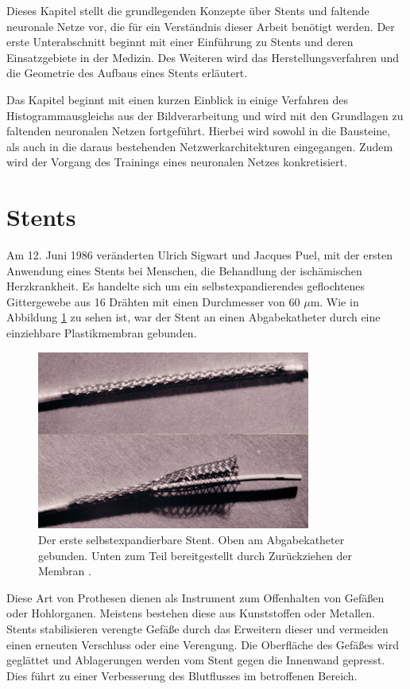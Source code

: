 Dieses Kapitel stellt die grundlegenden Konzepte über Stents und faltende neuronale Netze vor, die für ein Verständnis dieser Arbeit benötigt werden. Der erste Unterabschnitt beginnt mit einer Einführung zu Stents und deren Einsatzgebiete in der Medizin. Des Weiteren wird das Herstellungsverfahren und die Geometrie des Aufbaus eines Stents erläutert. 

\mypar Das Kapitel beginnt mit einen kurzen Einblick in einige Verfahren des Histogrammausgleichs aus der Bildverarbeitung und wird mit den Grundlagen zu faltenden neuronalen Netzen fortgeführt. Hierbei wird sowohl in die Bausteine, als auch in die daraus bestehenden Netzwerkarchitekturen eingegangen. Zudem wird der Vorgang des Trainings eines neuronalen Netzes konkretisiert. 


\section{Stents}\label{sec:?}
Am 12. Juni 1986 veränderten Ulrich Sigwart und Jacques Puel, mit der ersten Anwendung eines Stents bei Menschen, die Behandlung der ischämischen Herzkrankheit. Es handelte sich um ein selbstexpandierendes geflochtenes Gittergewebe aus 16 Drähten mit einen Durchmesser von 60 $\mu$m. Wie in Abbildung \ref{fig:stent_view} zu sehen ist, war der Stent an einen Abgabekatheter durch eine einziehbare Plastikmembran gebunden. \cite{sigwart}

\begin{figure}[h!]
\centering
\includegraphics[width=9cm]{98_images/first_stent.png}
\caption{Der erste selbstexpandierbare Stent. Oben am Abgabekatheter gebunden. Unten zum Teil bereitgestellt durch Zurückziehen der Membran \cite{sigwart}.}
\label{fig:stent_view}
\end{figure}

\mypar Diese Art von Prothesen dienen als Instrument zum Offenhalten von Gefäßen oder Hohlorganen. Meistens bestehen diese aus Kunststoffen oder Metallen. Stents stabilisieren verengte Gefäße durch das Erweitern dieser und vermeiden einen erneuten Verschluss oder eine Verengung. Die Oberfläche des Gefäßes wird geglättet und Ablagerungen werden vom Stent gegen die Innenwand gepresst. Dies führt zu einer Verbesserung des Blutflusses im betroffenen Bereich. \cite{stent_def}


